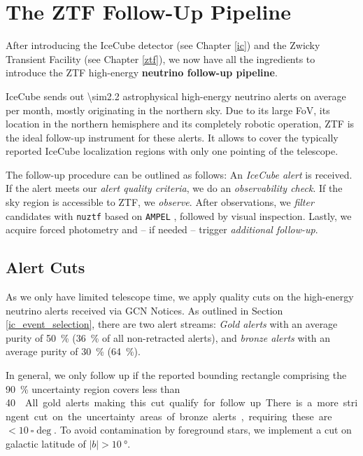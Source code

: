 \chapter{The ZTF Follow-Up Pipeline} \label{fupipeline}
After introducing the IceCube detector (see Chapter \ref{ic}) and the Zwicky Transient Facility (see Chapter \ref{ztf}), we now have all the ingredients to introduce the ZTF high-energy \textbf{neutrino follow-up pipeline}.

IceCube sends out \num{\sim2.2} astrophysical high-energy neutrino alerts on average per month, mostly originating in the northern sky. Due to its large FoV, its location in the northern hemisphere and its completely robotic operation, ZTF is the ideal follow-up instrument for these alerts. It allows to cover the typically reported IceCube localization regions with only one pointing of the telescope.

The follow-up procedure can be outlined as follows: An \textit{IceCube alert} is received. If the alert meets our \textit{alert quality criteria}, we do an \textit{observability check}. If the sky region is accessible to ZTF, we \textit{observe}. After observations, we \textit{filter} candidates with \texttt{nuztf} based on \texttt{AMPEL} , followed by visual inspection. Lastly, we acquire forced photometry and -- if needed -- trigger \textit{additional follow-up}.

\section{Alert Cuts}\label{alert_cuts}
As we only have limited telescope time, we apply quality cuts on the high-energy neutrino alerts received via GCN Notices. As outlined in Section \ref{ic_event_selection}, there are two alert streams: \textit{Gold alerts} with an average purity of \SI{50}{\percent} (\SI{36}{\percent} of all non-retracted alerts), and \textit{bronze alerts} with an average purity of \SI{30}{\percent} (\SI{64}{\percent}).

In general, we only follow up if the reported bounding rectangle comprising the \SI{90}{\percent} uncertainty region covers less than \SI{40}{\square\deg}. All gold alerts making this cut qualify for follow up. There is a more stringent cut on the uncertainty areas of bronze alerts, requiring these are $<\SI{10}{\square\deg}$. To avoid contamination by foreground stars, we implement a cut on galactic latitude of $|b|>\SI{10}{\degree}$.

